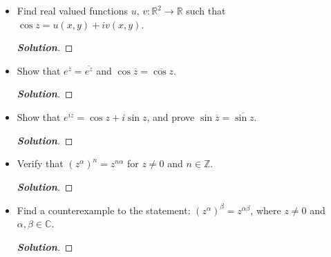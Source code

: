 \documentclass[11pt]{article}
\newenvironment{problem}[2][Problem\!]{\begin{trivlist}
\item[\hskip \labelsep {\bfseries #1}\hskip \labelsep {\bfseries #2}]}{\end{trivlist}}
\newenvironment{solution}{\begin{proof}[\textbf{\textit{Solution}}] }{\end{proof}}
\newcommand{\zz}{\mathbb Z}   %
\newcommand{\rr}{\mathbb R}   %
\newcommand{\cc}{\mathbb C}   %
\begin{document}
\begin{problem}{5.2}\hfill
\begin{itemize}[itemsep=3em]
\item[(a)] Find real valued functions $u,\, v : \rr^2 \to \rr$ such that $\cos z = u(x, y) + iv(x, y)$.
\begin{solution}
\end{solution}

\item[(b)] Show that $e^{\overline{z}} = \overline{e^z}$ and $\cos\overline{z} = \overline{\cos z}$.
\begin{solution}
\end{solution}

\item[(c)] Show that $e^{iz} = \cos z + i\sin z$, and prove $\sin\overline{z} = \overline{\sin z}$.
\begin{solution}
\end{solution}

\end{itemize}
\end{problem}

\newpage  %

\begin{problem}{5.3}\hfill
\begin{itemize}[itemsep=3em]
\item[(a)] Verify that $(z^\alpha)^n = z^{n\alpha}$ for $z \neq 0$ and $n \in \zz$.
\begin{solution}
\end{solution}

\item[(b)] Find a counterexample to the statement: $(z^{\alpha})^\beta = z^{\alpha\beta}$, where $z \neq 0$ and $\alpha,\beta \in \cc$.
\begin{solution}
\end{solution}

\end{itemize}
\end{problem}
\end{document}
